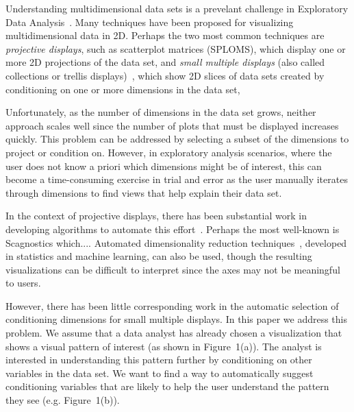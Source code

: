 

Understanding multidimensional data sets is a prevelant challenge in Exploratory Data Analysis~\cite{Tukey1977}. Many techniques have been proposed for visualizing multidimensional data in 2D. Perhaps the two most common techniques are
\emph{projective displays}, such as scatterplot matrices (SPLOMS), which display one or more 2D projections of the data set,
and \emph{small multiple displays} (also called collections or trellis displays)~\cite{Bertin1983, tufte1986, Becker1996}, which show 2D slices of data sets created by conditioning on one or more dimensions in the data set,

Unfortunately, as the number of dimensions in the data set grows, neither approach scales well since the number of plots that must be displayed increases quickly. This problem can be addressed by selecting a subset of the dimensions to project or condition on. However, in exploratory analysis scenarios, where the user does not know a priori which dimensions might be of interest, this can become a time-consuming exercise in trial and error as the user manually iterates through dimensions to find views that help explain their data set. 

In the context of projective displays, there has been substantial work in developing algorithms to automate this effort~\cite{Seo2005,Wilkinson2005,Sips2009}. Perhaps the most well-known is Scagnostics which....
Automated dimensionality reduction techniques~\cite{Friedman1974,Yang2003,Sedlmair2013}, developed in statistics and machine learning, can also be used, though the resulting visualizations can be difficult to interpret since the axes may not be meaningful to users.

However, there has been little corresponding work in the automatic selection of conditioning dimensions for small multiple displays. 
In this paper we address this problem.
We assume that a data analyst has already chosen a visualization that shows a visual pattern of interest (as shown in Figure~1(a)). The analyst is interested in understanding this pattern further by conditioning on other variables in the data set. We want to find a way to automatically suggest conditioning variables that are likely to help the user understand the pattern they see (e.g. Figure~1(b)).

